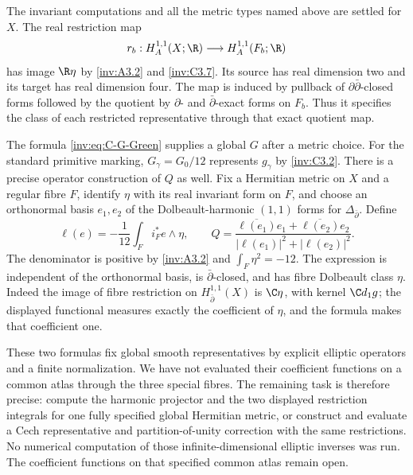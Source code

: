 

\begin{question}\label{inv:C3.8}

The invariant computations and all the metric types named above are
settled for $X$.  The real restriction map
\[
r_b:H_A^{1,1}(X;\R)\longrightarrow H_A^{1,1}(F_b;\R)
\]
has image $\R\eta$ by \ref{inv:A3.2} and \ref{inv:C3.7}.  Its source has real dimension
two and its target has real dimension four.  The map is induced by pullback of $\partial\bar\partial$-closed forms followed by the quotient by $\partial$- and $\bar\partial$-exact forms on $F_b$. Thus it specifies the class of each restricted representative through that exact quotient map.

The formula \eqref{inv:eq:C-G-Green} supplies a global $G$ after a metric
choice.  For the standard primitive marking, $G_\gamma=G_0/12$
represents $g_\gamma$ by \ref{inv:C3.2}.  There is a precise operator
construction of $Q$ as well.  Fix a Hermitian metric on $X$ and a
regular fibre $F$, identify $\eta$ with its real invariant form on
$F$, and choose an orthonormal basis $e_1,e_2$ of the Dolbeault-harmonic
$(1,1)$ forms for $\Delta_{\bar\partial}$.  Define
\[
\ell(e)=-\frac1{12}\int_F i_F^*e\wedge\eta,\qquad
Q=\frac{\overline{\ell(e_1)}e_1+
            \overline{\ell(e_2)}e_2}
          {|\ell(e_1)|^2+|\ell(e_2)|^2}.
\]
The denominator is positive by \ref{inv:A3.2} and
$\int_F\eta^2=-12$.  The expression is independent of the
orthonormal basis, is $\bar\partial$-closed, and has fibre
Dolbeault class $\eta$.  Indeed the image of fibre restriction on
$H^{1,1}_{\bar\partial}(X)$ is $\C\eta$, with kernel
$\C d_1g$; the displayed functional measures exactly the coefficient
of $\eta$, and the formula makes that coefficient one.

These two formulas fix global smooth representatives by explicit
elliptic operators and a finite normalization.  We have not evaluated
their coefficient functions on a common atlas through the three
special fibres.  The remaining task is therefore precise: compute
the harmonic projector and the two displayed restriction integrals
for one fully specified global Hermitian metric, or construct and
evaluate a Cech representative and partition-of-unity correction
with the same restrictions.  No numerical computation of those
infinite-dimensional elliptic inverses was run.  The coefficient functions on that specified common atlas remain open.
\end{question}

